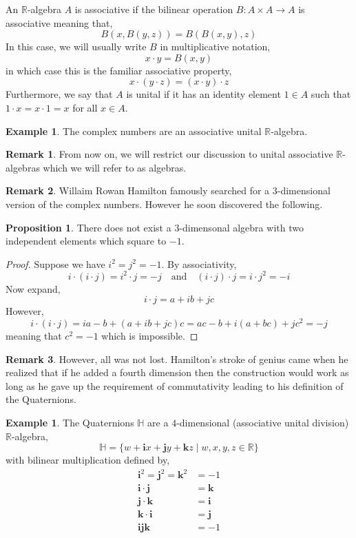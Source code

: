\documentclass[12pt]{extarticle}
\newcommand{\R}{\mathbb{R}}
\theoremstyle{definition}
\newtheorem{proposition}[theorem]{Proposition}
\newtheorem{example}[theorem]{Example}
\newtheorem{remark}{Remark}
\newenvironment{definition}[1][Definition:]{\begin{trivlist}
\item[\hskip \labelsep {\bfseries #1}]}{\end{trivlist}}
\renewcommand{\bf}[1]{\mathbf{#1}}
\renewcommand{\H}{\mathbb{H}}
\begin{document}
\begin{definition}
An $\R$-algebra $A$ is associative if the bilinear operation $B : A \times A \to A$ is associative meaning that,
\[ B(x, B(y, z)) = B(B(x, y), z) \]
In this case, we will usually write $B$ in multiplicative notation,
\[ x \cdot y = B(x, y) \]
in which case this is the familiar associative property,
\[ x \cdot (y \cdot z)= (x \cdot y) \cdot z \] 
Furthermore, we say that $A$ is unital if it has an identity element $1 \in A$ such that $1 \cdot x = x \cdot 1 = x$ for all $x \in A$.
\end{definition}

\begin{example}
The complex numbers are an associative unital $\R$-algebra. 
\end{example}

\begin{remark}
From now on, we will restrict our discussion to unital associative $\R$-algebras which we will refer to as algebras. 
\end{remark}

\begin{remark}
Willaim Rowan Hamilton famously searched for a $3$-dimensional version of the complex numbers. However he soon discovered the following.
\end{remark}

\begin{proposition}
There does not exist a $3$-dimensonal algebra with two independent elements which square to $-1$.
\end{proposition}

\begin{proof}
Suppose we have $i^2 = j^2 = -1$. By associativity,
\[ i \cdot (i \cdot j) = i^2 \cdot j = - j \quad \text{and} \quad (i \cdot j) \cdot j = i \cdot j^2 = - i \]
Now expand,
\[ i \cdot j = a + i b + j c \]
However,
\[ i \cdot (i \cdot j) = i a - b + (a + i b + j c)c = ac - b + i(a  + bc) + j c^2 = - j \]
meaning that $c^2 = - 1$ which is impossible.  
\end{proof}

\begin{remark}
However, all was not lost. Hamilton's stroke of genius came when he realized that if he added a fourth dimension then the construction would work as long as he gave up the requirement of commutativity leading to his definition of the Quaternions.
\end{remark}

\begin{example}
The Quaternions $\H$ are a $4$-dimensional (associative unital division) $\R$-algebra,
\[ \H = \{ w + \bf{i} x + \bf{j} y + \bf{k} z \mid w,x,y,z \in \R \} \]
with bilinear multiplication defined by,
\begin{align*}
\bf{i}^2 = \bf{j}^2 = \bf{k}^2 & = - 1
\\
\bf{i} \cdot \bf{j} & = \bf{k}
\\
\bf{j} \cdot \bf{k} & = \bf{i}
\\
\bf{k} \cdot \bf{i} & = \bf{j}
\\
\bf{i} \bf{j} \bf{k} & = -1
\end{align*}
\end{example}
\end{document}
